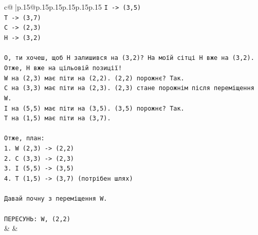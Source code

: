 \documentclass{article}
\begin{document}
{\begin{supertabular}{c@{$\;$}|p{.15\linewidth}@{}p{.15\linewidth}p{.15\linewidth}p{.15\linewidth}p{.15\linewidth}p{.15\linewidth}}
{{{\texttt{I {-}> (3,5)} \\
\texttt{T {-}> (3,7)} \\
\texttt{C {-}> (2,3)} \\
\texttt{H {-}> (3,2)} \\
\\ 
\texttt{О, ти хочеш, щоб H залишився на (3,2)? На моїй сітці H вже на (3,2). Отже, H вже на цільовій позиції!} \\
\texttt{W на (2,3) має піти на (2,2). (2,2) порожнє? Так.} \\
\texttt{C на (3,3) має піти на (2,3). (2,3) стане порожнім після переміщення W.} \\
\texttt{I на (5,5) має піти на (3,5). (3,5) порожнє? Так.} \\
\texttt{T на (1,5) має піти на (3,7).} \\
\\ 
\texttt{Отже, план:} \\
\texttt{1. W (2,3) {-}> (2,2)} \\
\texttt{2. C (3,3) {-}> (2,3)} \\
\texttt{3. I (5,5) {-}> (3,5)} \\
\texttt{4. T (1,5) {-}> (3,7) (потрібен шлях)} \\
\\ 
\texttt{Давай почну з переміщення W.} \\
\\ 
\texttt{ПЕРЕСУНЬ: W, (2,2)} \\
            }
        }
    }
    & & \\ \\


\end{supertabular}}
\end{document}
